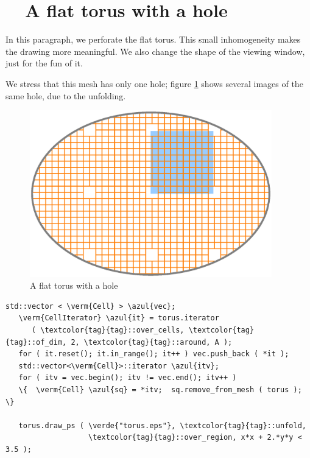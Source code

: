\section{~~A flat torus with a hole}\label{\numb section 7.\numb parag 6}

In this paragraph, we perforate the flat torus.
This small inhomogeneity makes the drawing more meaningful.
We also change the shape of the viewing window, just for the fun of it.

We stress that this mesh has only one hole; figure \ref{\numb section 7.\numb fig 2}
shows several images of the same hole, due to the unfolding.

\begin{figure}[ht] \centering
  \includegraphics[width=105mm]{flat-torus-2.eps}
  \caption{A flat torus with a hole}
  \label{\numb section 7.\numb fig 2}
\end{figure}

\begin{Verbatim}[commandchars=\\\{\},formatcom=\small\tt,frame=single,
   label=parag-\ref{\numb section 7.\numb parag 6}.cpp,rulecolor=\color{coment},
   baselinestretch=0.94,framesep=2mm                                            ]
   std::vector < \verm{Cell} > \azul{vec};
   \verm{CellIterator} \azul{it} = torus.iterator
      ( \textcolor{tag}{tag}::over_cells, \textcolor{tag}{tag}::of_dim, 2, \textcolor{tag}{tag}::around, A );
   for ( it.reset(); it.in_range(); it++ ) vec.push_back ( *it );
   std::vector<\verm{Cell}>::iterator \azul{itv};
   for ( itv = vec.begin(); itv != vec.end(); itv++ )
   \{  \verm{Cell} \azul{sq} = *itv;  sq.remove_from_mesh ( torus );  \}

   torus.draw_ps ( \verde{"torus.eps"}, \textcolor{tag}{tag}::unfold,
                   \textcolor{tag}{tag}::over_region, x*x + 2.*y*y < 3.5 );
\end{Verbatim}

